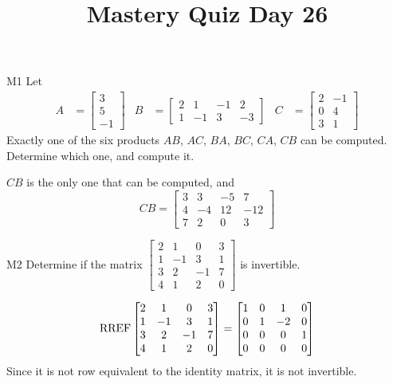 \documentclass{sbgLAquiz}
\title{Mastery Quiz Day 26 }
\begin{document}
\begin{problem}{M1}
Let 
\begin{align*}
A &= \begin{bmatrix} 3 \\ 5 \\ -1  \end{bmatrix} & B&=\begin{bmatrix}  2 & 1 & -1 & 2 \\ 1 & -1 & 3 & -3  \end{bmatrix} & C &= \begin{bmatrix} 2 & -1 \\ 0 & 4 \\ 3 & 1 \end{bmatrix} \end{align*}
Exactly one of the six products $AB$, $AC$, $BA$, $BC$, $CA$, $CB$ can be computed.  Determine which one, and compute it.
\end{problem}
\begin{solution}
$CB$ is the only one that can be computed, and
$$CB=\begin{bmatrix} 3 & 3 & -5 & 7 \\ 4 & -4 & 12 & -12 \\ 7 & 2 & 0 & 3 \end{bmatrix}$$
\end{solution}
\begin{problem}{M2}
Determine if the matrix $\begin{bmatrix} 2 & 1 & 0 & 3 \\ 1 & -1 & 3 & 1 \\ 3 & 2 & -1 & 7 \\ 4 & 1 & 2 & 0 \end{bmatrix}$ is invertible.
\end{problem}
\begin{solution}
$$\operatorname{RREF} \begin{bmatrix} 2 & 1 & 0 & 3 \\ 1 & -1 & 3 & 1 \\ 3 & 2 & -1 & 7 \\ 4 & 1 & 2 & 0 \end{bmatrix}=\begin{bmatrix} 1 & 0 & 1 & 0 \\ 0 & 1 & -2 & 0 \\ 0 & 0 & 0 & 1 \\ 0 & 0 & 0 & 0 \end{bmatrix}$$
Since it is not row equivalent to the identity matrix, it is not invertible.
\end{solution}
\end{document}
